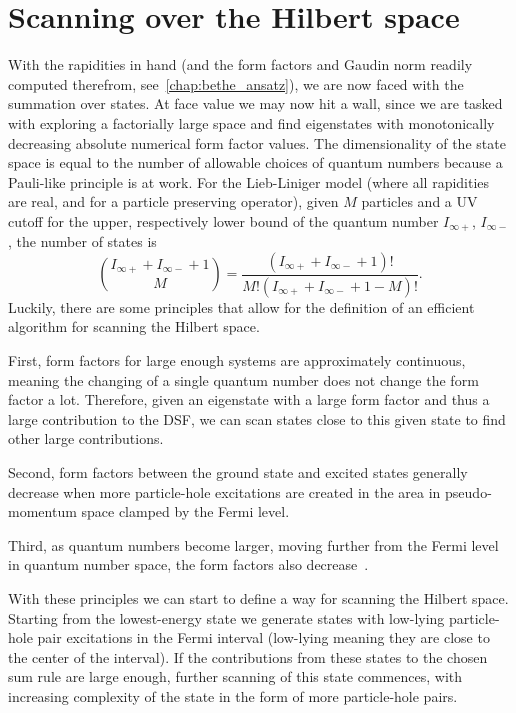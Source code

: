 \documentclass[11pt, a4paper]{report} %
\begin{document}
\section{Scanning over the Hilbert space}

With the rapidities in hand (and the form factors and Gaudin norm readily computed therefrom, see~\cref{chap:bethe_ansatz}), we are now faced with the summation over states.
At face value we may now hit a wall, since we are tasked with exploring a factorially large space and find eigenstates with monotonically decreasing absolute numerical form factor values.
The dimensionality of the state space is equal to the number of allowable choices of quantum numbers because a Pauli-like principle is at work.
For the Lieb-Liniger model (where all rapidities are real, and for a particle preserving operator), given $M$ particles and a UV cutoff for the upper, respectively lower bound of the quantum number $I_{\infty+}$, $I_{\infty-}$, the number of states is~\cite{Caux2009}
\begin{equation}
  \binom{I_{\infty+} + I_{\infty-} + 1}{M} = \frac{(I_{\infty+} + I_{\infty-} + 1)!}{M!(I_{\infty+} + I_{\infty-} + 1 - M)!}.
\end{equation}
Luckily, there are some principles that allow for the definition of an efficient algorithm for scanning the Hilbert space.

First, form factors for large enough systems are approximately continuous, meaning the changing of a single quantum number does not change the form factor a lot.
Therefore, given an eigenstate with a large form factor and thus a large contribution to the DSF, we can scan states close to this given state to find other large contributions.

Second, form factors between the ground state and excited states generally decrease when more particle-hole excitations are created in the area in pseudo-momentum space clamped by the Fermi level.

Third, as quantum numbers become larger, moving further from the Fermi level in quantum number space, the form factors also decrease~\cite{Caux2009}.

With these principles we can start to define a way for scanning the Hilbert space.
Starting from the lowest-energy state we generate states with low-lying particle-hole pair excitations in the Fermi interval (low-lying meaning they are close to the center of the interval).
If the contributions from these states to the chosen sum rule are large enough, further scanning of this state commences, with increasing complexity of the state in the form of more particle-hole pairs.
\end{document}
